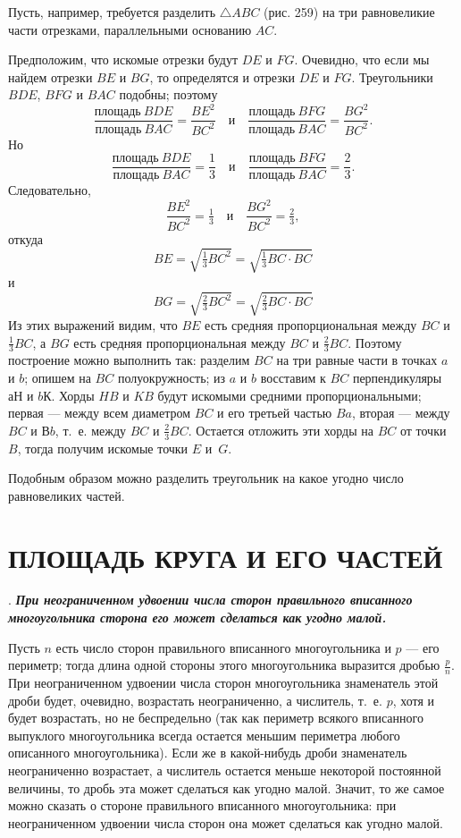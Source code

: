 \documentclass[oneside]{book}
\begin{document}
Пусть, например, требуется разделить $\triangle ABC$ (рис. 259) на три равновеликие части отрезками, параллельными основанию $AC$.

Предположим, что искомые отрезки будут $DE$ и $FG$.
Очевидно, что если мы найдем отрезки $BE$ и $BG$, то определятся и отрезки $DE$ и $FG$.
Треугольники $BDE$, $BFG$ и $BAC$ подобны;
поэтому
\[\frac{\text{площадь}~BDE}{\text{площадь}~BAC}=\frac{BE^2}{BC^2}
\quad\text{и}\quad
\frac{\text{площадь}~BFG}{\text{площадь}~BAC}=\frac{BG^2}{BC^2}.\]
Но
\[\frac{\text{площадь}~BDE}{\text{площадь}~BAC}=\frac{1}{3}
\quad\text{и}\quad
\frac{\text{площадь}~BFG}{\text{площадь}~BAC}=\frac{2}{3}.\]
Следовательно,
\[\frac{BE^2}{BC^2}=\tfrac13
\quad\text{и}\quad
\frac{BG^2}{BC^2}=\tfrac23,\]
откуда
\[BE=\sqrt{\tfrac13BC^2}=\sqrt{\tfrac13BC\cdot BC}\]
и
\[BG=\sqrt{\tfrac23BC^2}=\sqrt{\tfrac23BC\cdot BC}\]
Из этих выражений видим, что $BE$ есть средняя пропорциональная между $BC$ и $\tfrac13BC$, а $BG$ есть средняя пропорциональная между $BC$ и $\tfrac23BC$.
Поэтому построение можно выполнить так:
разделим $BC$ на три равные части в точках $a$ и $b$;
опишем на $BC$ полуокружность;
из $a$ и $b$ восставим к $BC$ перпендикуляры аН и $b$К.
Хорды $HB$ и $KB$ будут искомыми средними пропорциональными;
первая — между всем диаметром $BC$ и его третьей частью $Ba$, вторая — между $BC$ и В$b$, т.~е. между $BC$ и $\tfrac23BC$.
Остается отложить эти хорды на $BC$ от точки $B$, тогда получим искомые точки $E$ и~$G$.

Подобным образом можно разделить треугольник на какое угодно число равновеликих частей.

\section{ПЛОЩАДЬ КРУГА И ЕГО ЧАСТЕЙ}

.
\textbf{\emph{При неограниченном удвоении числа сторон правильного вписанного многоугольника сторона его может сделаться как угодно малой.}}

Пусть $n$ есть число сторон правильного вписанного многоугольника и $p$ — его периметр;
тогда длина одной стороны этого многоугольника выразится дробью $\tfrac pn$.
При неограниченном удвоении числа сторон многоугольника знаменатель этой дроби будет, очевидно, возрастать неограниченно, а числитель, т.~е. $p$, хотя и будет возрастать, но не беспредельно (так как периметр всякого вписанного выпуклого многоугольника всегда остается меньшим периметра любого описанного многоугольника).
Если же в какой-нибудь дроби знаменатель неограниченно возрастает, а числитель остается меньше некоторой постоянной величины, то дробь эта может сделаться как угодно малой.
Значит, то же самое можно сказать о стороне правильного вписанного многоугольника:
при неограниченном удвоении числа сторон она может сделаться как угодно малой.
\end{document}
